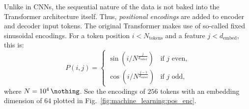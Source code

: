 Unlike in CNNs, the sequential nature of the data is not baked into the Transformer architecture itself. Thus, \emph{positional encodings} are added to encoder and decoder input tokens. The original Transformer makes use of so-called fixed sinusoidal encodings. For a token position $i<N_\text{tokens}$ and a feature $j<d_\text{embed}$, this is:  
\begin{equation}
	P(i,j) = \begin{cases}
		\sin{({i}/{N^{\frac{j}{d_\text{embed}}}})} & \text{if $j$ even,} \\
		\cos{({i}/{N^{\frac{j-1}{d_\text{embed}}}})} & \text{if $j$ odd,}
	\end{cases}
\end{equation}
where $N=\SI{E+4}{\nothing}$. See the encodings of $256$ tokens with an embedding dimension of $64$ plotted in Fig.~\ref{fig:machine_learning:pos_enc}.

%

